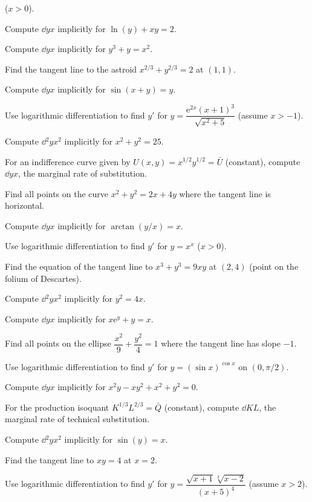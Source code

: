 \begin{problems}
        ($x>0$).
  \item Compute $\dd{y}{x}$ implicitly for $\ln(y)+xy=2$.
  \item Compute $\dd{y}{x}$ implicitly for $y^{3}+y=x^{2}$.
  \item Find the tangent line to the astroid $x^{2/3}+y^{2/3}=2$ at
        $(1,1)$.
  \item Compute $\dd{y}{x}$ implicitly for $\sin(x+y)=y$.
  \item Use logarithmic differentiation to find $y'$ for
        $y=\dfrac{\mathrm{e}^{2x}(x+1)^{3}}{\sqrt{x^{2}+5}}$ (assume $x>-1$).
  \item Compute $\dd{^{2}y}{x^{2}}$ implicitly for $x^{2}+y^{2}=25$.
  \item For an indifference curve given by $U(x,y)=x^{1/2}y^{1/2}=\bar U$
        (constant), compute $\dd{y}{x}$, the marginal rate of
        substitution.
  \item Find all points on the curve $x^{2}+y^{2}=2x+4y$ where the tangent
        line is horizontal.
  \item Compute $\dd{y}{x}$ implicitly for $\arctan(y/x)=x$.
  \item Use logarithmic differentiation to find $y'$ for $y=x^{x}$
        ($x>0$).
  \item Find the equation of the tangent line to $x^{3}+y^{3}=9xy$ at
        $(2,4)$ (point on the folium of Descartes).
  \item Compute $\dd{^{2}y}{x^{2}}$ implicitly for $y^{2}=4x$.
  \item Compute $\dd{y}{x}$ implicitly for $x\mathrm{e}^{y}+y=x$.
  \item Find all points on the ellipse $\dfrac{x^{2}}{9}+\dfrac{y^{2}}{4}=1$
        where the tangent line has slope $-1$.
  \item Use logarithmic differentiation to find $y'$ for
        $y=(\sin x)^{\cos x}$ on $(0,\pi/2)$.
  \item Compute $\dd{y}{x}$ implicitly for $x^{2}y-xy^{2}+x^{2}+y^{2}=0$.
  \item For the production isoquant $K^{1/3}L^{2/3}=\bar Q$ (constant),
        compute $\dd{K}{L}$, the marginal rate of technical
        substitution.
  \item Compute $\dd{^{2}y}{x^{2}}$ implicitly for $\sin(y)=x$.
  \item Find the tangent line to $xy=4$ at $x=2$.
  \item Use logarithmic differentiation to find $y'$ for
        $y=\dfrac{\sqrt{x+1}\sqrt[3]{x-2}}{(x+5)^{4}}$ (assume $x>2$).

\end{problems}
